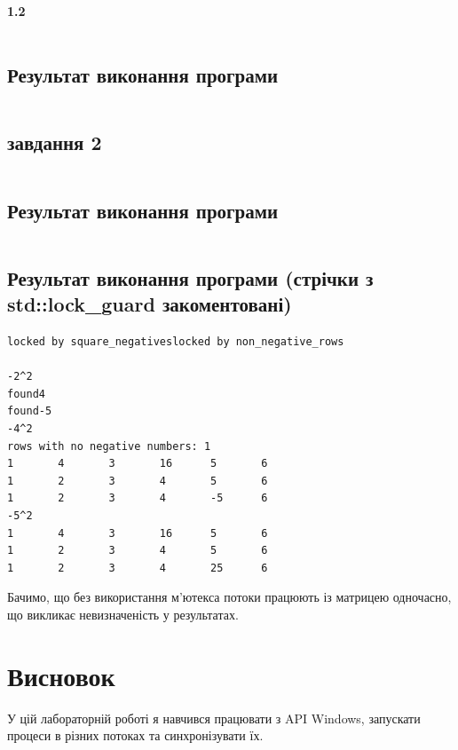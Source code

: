 \documentclass[a4paper, 12pt, oneside]{extarticle}
\begin{document}
\paragraph{1.2}

\inputminted{c++}{1.2.cpp}
\subsection*{Результат виконання програми}
\inputminted{c++}{1.2.out}

\subsection*{завдання 2}
\inputminted{c++}{task_2.cpp}
\subsection*{Результат виконання програми}
\inputminted{c++}{task_2.out}

\subsection*{Результат виконання програми (стрічки з std::lock_guard закоментовані)}
\begin{verbatim}
locked by square_negativeslocked by non_negative_rows

-2^2
found4
found-5
-4^2
rows with no negative numbers: 1
1       4       3       16      5       6
1       2       3       4       5       6
1       2       3       4       -5      6
-5^2
1       4       3       16      5       6
1       2       3       4       5       6
1       2       3       4       25      6
\end{verbatim}

Бачимо, що без використання м'ютекса потоки працюють
із матрицею одночасно, що викликає невизначеність у
результатах.

\section*{Висновок}

У цій лабораторній роботі я навчився працювати з API Windows, запускати
процеси в різних потоках та синхронізувати їх.
\end{document}
